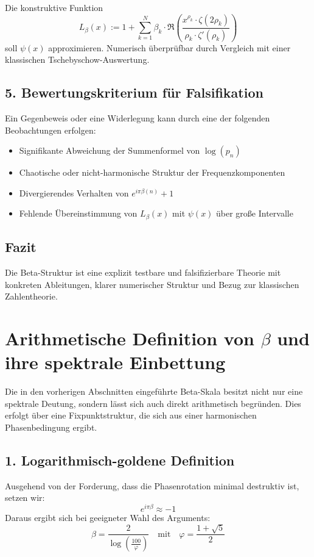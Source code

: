 \documentclass[a4paper,12pt]{article}
\begin{document}
\begin{center}
Die konstruktive Funktion
\[
L_\beta(x) := 1 + \sum_{k=1}^N \beta_k \cdot \Re\left( \frac{x^{\rho_k} \cdot \zeta(2\rho_k)}{\rho_k \cdot \zeta'(\rho_k)} \right)
\]
soll $\psi(x)$ approximieren. Numerisch überprüfbar durch Vergleich mit einer klassischen Tschebyschow-Auswertung.

\subsection*{5. Bewertungskriterium für Falsifikation}

Ein Gegenbeweis oder eine Widerlegung kann durch eine der folgenden Beobachtungen erfolgen:
\begin{itemize}
    \item Signifikante Abweichung der Summenformel von $\log(p_n)$
    \item Chaotische oder nicht-harmonische Struktur der Frequenzkomponenten
    \item Divergierendes Verhalten von $e^{i \pi \beta(n)} + 1$
    \item Fehlende Übereinstimmung von $L_\beta(x)$ mit $\psi(x)$ über große Intervalle
\end{itemize}

\subsection*{Fazit}
Die Beta-Struktur ist eine explizit testbare und falsifizierbare Theorie mit konkreten Ableitungen, klarer numerischer Struktur und Bezug zur klassischen Zahlentheorie.

\section{Arithmetische Definition von \texorpdfstring{\(\beta\)}{beta} und ihre spektrale Einbettung}

Die in den vorherigen Abschnitten eingeführte Beta-Skala besitzt nicht nur eine spektrale Deutung, sondern lässt sich auch direkt arithmetisch begründen. Dies erfolgt über eine Fixpunktstruktur, die sich aus einer harmonischen Phasenbedingung ergibt.

\subsection*{1. Logarithmisch-goldene Definition}

Ausgehend von der Forderung, dass die Phasenrotation minimal destruktiv ist, setzen wir:
\[
e^{i \pi \beta} \approx -1
\]
Daraus ergibt sich bei geeigneter Wahl des Arguments:
\[
\beta = \frac{2}{\log\left( \frac{100}{\varphi} \right)}
\quad \text{mit} \quad \varphi = \frac{1 + \sqrt{5}}{2}
\]


\end{center}
\end{document}
